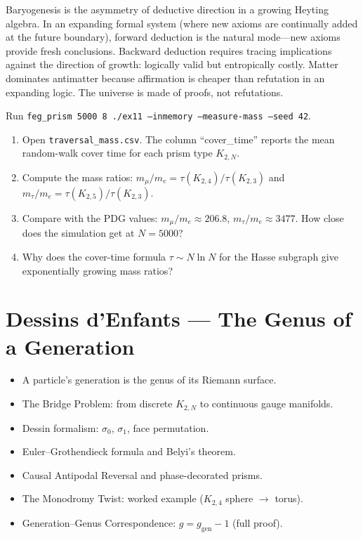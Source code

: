 \documentclass[11pt, a4paper, openany]{book}
\newenvironment{introduction}[1][Modulo Overview]{%
  \begin{tcolorbox}[
    enhanced,colback=structure!5,colframe=structure,
    colbacktitle=structure,coltitle=white,
    fonttitle=\small\bfseries,title={#1},
    arc=2pt,boxrule=0.7pt,
    left=8pt,right=8pt,top=6pt,bottom=6pt,
    before skip=12pt,after skip=12pt
  ]\itshape\begin{itemize}[leftmargin=*,itemsep=2pt,parsep=0pt]
}{%
  \end{itemize}\end{tcolorbox}
}
\begin{document}
\begin{logicalreading}
Baryogenesis is the asymmetry of deductive direction in a growing Heyting algebra. In an expanding formal system (where new axioms are continually added at the future boundary), forward deduction is the natural mode---new axioms provide fresh conclusions. Backward deduction requires tracing implications against the direction of growth: logically valid but entropically costly. Matter dominates antimatter because affirmation is cheaper than refutation in an expanding logic. The universe is made of proofs, not refutations.
\end{logicalreading}

\begin{simulation}
Run \texttt{feg\_prism 5000 8 ./ex11 --inmemory --measure-mass --seed 42}.
\begin{enumerate}
\item Open \texttt{traversal\_mass.csv}. The column ``cover\_time'' reports the mean random-walk cover time for each prism type $K_{2,N}$.
\item Compute the mass ratios: $m_\mu/m_e = \tau(K_{2,4})/\tau(K_{2,3})$ and $m_\tau/m_e = \tau(K_{2,5})/\tau(K_{2,3})$.
\item Compare with the PDG values: $m_\mu/m_e \approx 206.8$, $m_\tau/m_e \approx 3477$. How close does the simulation get at $N = 5000$?
\item Why does the cover-time formula $\tau \sim N \ln N$ for the Hasse subgraph give exponentially growing mass ratios?
\end{enumerate}
\end{simulation}

\chapter{Dessins d'Enfants --- The Genus of a Generation}\label{ch:dessins}

\begin{introduction}
  \item A particle's generation is the genus of its Riemann surface.
  \item The Bridge Problem: from discrete $K_{2,N}$ to continuous gauge manifolds.
  \item Dessin formalism: $\sigma_0$, $\sigma_1$, face permutation.
  \item Euler--Grothendieck formula and Belyi's theorem.
  \item Causal Antipodal Reversal and phase-decorated prisms.
  \item The Monodromy Twist: worked example ($K_{2,4}$ sphere $\to$ torus).
  \item Generation--Genus Correspondence: $g = g_{\mathrm{gen}} - 1$ (full proof).
\end{introduction}
\end{document}
